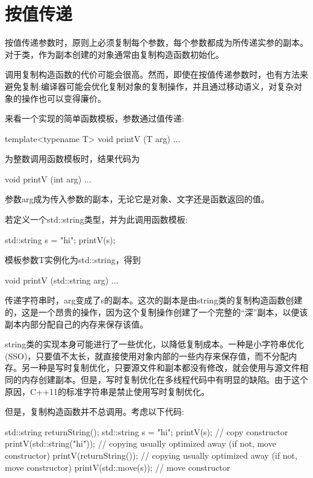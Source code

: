 \section{按值传递}
按值传递参数时，原则上必须复制每个参数，每个参数都成为所传递实参的副本。对于类，作为副本创建的对象通常由复制构造函数初始化。

调用复制构造函数的代价可能会很高。然而，即使在按值传递参数时，也有方法来避免复制:编译器可能会优化复制对象的复制操作，并且通过移动语义，对复杂对象的操作也可以变得廉价。

来看一个实现的简单函数模板，参数通过值传递:

\begin{cpp}
template<typename T>
void printV (T arg) {
	...
}
\end{cpp}

为整数调用函数模板时，结果代码为

\begin{cpp}
void printV (int arg) {
	...
}
\end{cpp}

参数arg成为传入参数的副本，无论它是对象、文字还是函数返回的值。

若定义一个std::string类型，并为此调用函数模板:

\begin{cpp}
std::string s = "hi";
printV(s);
\end{cpp}

模板参数T实例化为std::string，得到

\begin{cpp}
void printV (std::string arg)
{
	...
}
\end{cpp}

传递字符串时，arg变成了s的副本。这次的副本是由string类的复制构造函数创建的，这是一个昂贵的操作，因为这个复制操作创建了一个完整的“深”副本，以便该副本内部分配自己的内存来保存该值。

\begin{notice}
string类的实现本身可能进行了一些优化，以降低复制成本。一种是小字符串优化(SSO)，只要值不太长，就直接使用对象内部的一些内存来保存值，而不分配内存。另一种是写时复制优化，只要源文件和副本都没有修改，就会使用与源文件相同的内存创建副本。但是，写时复制优化在多线程代码中有明显的缺陷。由于这个原因，C++11的标准字符串是禁止使用写时复制优化。
\end{notice}

但是，复制构造函数并不总调用。考虑以下代码:

\begin{cpp}
std::string returnString();
std::string s = "hi";
printV(s); // copy constructor
printV(std::string("hi")); // copying usually optimized away (if not, move constructor)
printV(returnString()); // copying usually optimized away (if not, move constructor)
printV(std::move(s)); // move constructor
\end{cpp}


